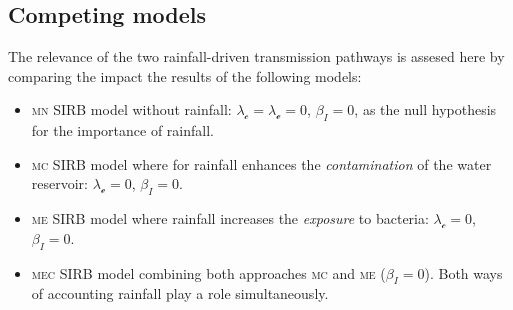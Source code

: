 



\subsection{Competing models}
The relevance of the two rainfall-driven transmission pathways is assesed here by comparing the impact the results of the following models:
\begin{itemize}
 \item \textsc{mn} SIRB model without rainfall: $\lambda_{\mathcal{c}} = \lambda_{\mathcal{e}} = 0$, $\beta_{I} = 0$, as the null hypothesis for the importance of rainfall.
  \item \textsc{mc} SIRB model where for rainfall enhances the \textit{contamination} of the water reservoir: $\lambda_{\mathcal{e}} = 0$, $\beta_{I} = 0$. 
  \item \textsc{me} SIRB model where rainfall increases the \textit{exposure} to bacteria: $\lambda_{\mathcal{c}} = 0$, $\beta_{I} = 0$. 
  \item \textsc{mec} SIRB model combining both approaches \textsc{mc} and \textsc{me} ($\beta_{I} = 0$). Both ways of accounting rainfall play a role simultaneously.
\end{itemize}
